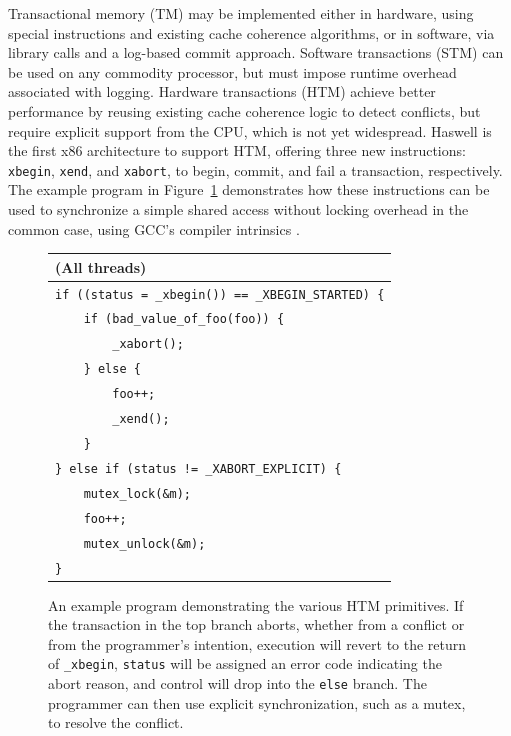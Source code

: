 Transactional memory (TM) may be implemented either in hardware, using special instructions and existing cache coherence algorithms,
or in software, via library calls and a log-based commit approach.
Software transactions (STM) \cite{stm-pldi06} can be used on any commodity processor, but must impose runtime overhead associated with logging.
Hardware transactions (HTM) \cite{htm-experience, htm-performance} achieve better performance by reusing existing cache coherence logic to detect conflicts, but require explicit support from the CPU, which is not yet widespread.
Haswell \cite{htm-haswell} is the first x86 architecture to support HTM,
offering three new instructions: \texttt{xbegin}, \texttt{xend}, and \texttt{xabort}, to begin, commit, and fail a transaction, respectively.
The example program in Figure~\ref{fig:htm-example} demonstrates how these instructions can be used to synchronize a simple shared access without locking overhead in the common case,
using GCC's compiler intrinsics \cite{htm-gcc}.

\begin{figure}[h]
	\begin{center}
		\begin{tabular}{l}
		\textbf{(All threads)} \\
		\hline
		\texttt{if ((status = \_xbegin()) == \_XBEGIN\_STARTED) \{} \\
		\texttt{~~~~if (bad\_value\_of\_foo(foo)) \{} \\
		\texttt{~~~~~~~~\_xabort();} \\
		\texttt{~~~~\} else \{} \\
		\texttt{~~~~~~~~foo++;} \\
		\texttt{~~~~~~~~\_xend();} \\
		\texttt{~~~~\}} \\
		\texttt{\} else if (status != \_XABORT\_EXPLICIT) \{} \\
		\texttt{~~~~mutex\_lock(\&m);} \\
		\texttt{~~~~foo++;} \\
		\texttt{~~~~mutex\_unlock(\&m);} \\
		\texttt{\}} \\
		\end{tabular}
	\end{center}
	\caption{An example program demonstrating the various HTM primitives.
		If the transaction in the top branch aborts,
		whether from a conflict or from the programmer's intention,
		execution will revert to the return of {\tt \_xbegin},
		{\tt status} will be assigned an error code indicating the abort reason,
		and control will drop into the {\tt else} branch.
		The programmer can then use explicit synchronization, such as a mutex, to resolve the conflict.}
	\label{fig:htm-example}
\end{figure}

